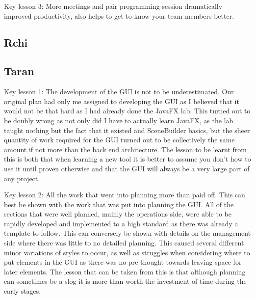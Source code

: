 Key lesson 3:
More meetings and pair programming session dramatically improved productivity, also helps to get to know your team members better.

\subsection{Rchi}

\subsection{Taran}
Key lesson 1:
The development of the GUI is not to be underestimated. Our original plan had only me assigned to developing the GUI as I believed that it would not be that hard as I had already done the JavaFX lab. This turned out to be doubly wrong as not only did I have to actually learn JavaFX, as the lab taught nothing but the fact that it existed and SceneBuilder basics, but the sheer quantity of work required for the GUI turned out to be collectively the same amount if not more than the back end architecture.
The lesson to be learnt from this is both that when learning a new tool it is better to assume you don't how to use it until proven otherwise and that the GUI will always be a very large part of any project.

Key lesson 2:
All the work that went into planning more than paid off. This can best be shown with the work that was put into planning the GUI. All of the sections that were well planned, mainly the operations side, were able to be rapidly developed and implemented to a high standard as there was already a template to follow. This can conversely be shown with details on the management side where there was little to no detailed planning. This caused several different minor variations of styles to occur, as well as struggles when considering where to put elements in the GUI as there was no pre thought towards leaving space for later elements.
The lesson that can be taken from this is that although planning can sometimes be a slog it is  more than worth the investment of time during the early stages.
